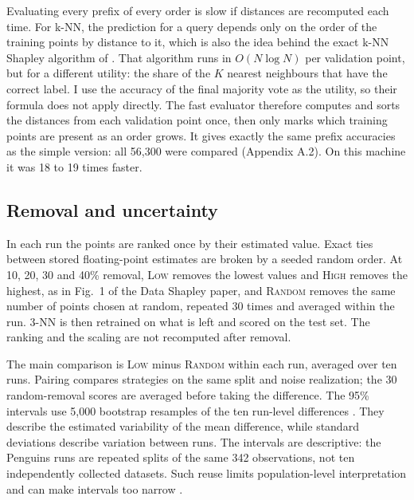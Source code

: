 \documentclass[10pt]{article}
\newcommand{\low}{\textsc{Low}}
\newcommand{\rand}{\textsc{Random}}
\newcommand{\high}{\textsc{High}}
\begin{document}
Evaluating every prefix of every order is slow if distances are recomputed each time. For k-NN, the prediction for a query depends only on the order of the training points by distance to it, which is also the idea behind the exact k-NN Shapley algorithm of \citet{jia2019knn}. That algorithm runs in $O(N\log N)$ per validation point, but for a different utility: the share of the $K$ nearest neighbours that have the correct label. I use the accuracy of the final majority vote as the utility, so their formula does not apply directly. The fast evaluator therefore computes and sorts the distances from each validation point once, then only marks which training points are present as an order grows. It gives exactly the same prefix accuracies as the simple version: all 56,300 were compared (Appendix A.2). On this machine it was 18 to 19 times faster.

\subsection{Removal and uncertainty}
In each run the points are ranked once by their estimated value. Exact ties between stored floating-point estimates are broken by a seeded random order. At 10, 20, 30 and 40\% removal, \low{} removes the lowest values and \high{} removes the highest, as in Fig.~1 of the Data Shapley paper, and \rand{} removes the same number of points chosen at random, repeated 30 times and averaged within the run. 3-NN is then retrained on what is left and scored on the test set. The ranking and the scaling are not recomputed after removal.

The main comparison is \low{} minus \rand{} within each run, averaged over ten runs. Pairing compares strategies on the same split and noise realization; the 30 random-removal scores are averaged before taking the difference. The 95\% intervals use 5,000 bootstrap resamples of the ten run-level differences \citep{efron1993}. They describe the estimated variability of the mean difference, while standard deviations describe variation between runs. The intervals are descriptive: the Penguins runs are repeated splits of the same 342 observations, not ten independently collected datasets. Such reuse limits population-level interpretation and can make intervals too narrow \citep{nadeau2003}.
\end{document}
